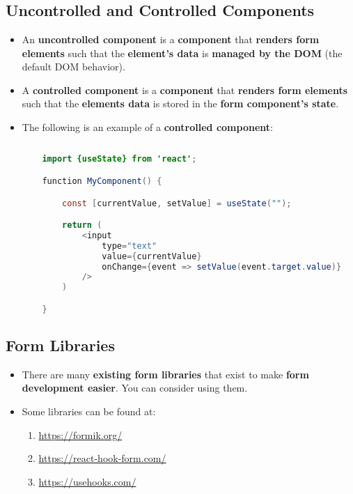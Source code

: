 \documentclass{article}
\begin{document}
    \section*{}

    \subsection*{Uncontrolled and Controlled Components}
    \begin{itemize}
        \item An \textbf{uncontrolled component} is a \textbf{component} that \textbf{renders form elements} such that the \textbf{element's data} is \textbf{managed by the DOM} (the default DOM behavior).
        \item A \textbf{controlled component} is a \textbf{component} that \textbf{renders form elements} such that the \textbf{elements data} is stored in the \textbf{form component's state}.
        \item The following is an example of a \textbf{controlled component}:
        \begin{lstlisting}[language=Java]
            
    import {useState} from 'react';

    function MyComponent() {

        const [currentValue, setValue] = useState("");

        return (
            <input 
                type="text"
                value={currentValue}
                onChange={event => setValue(event.target.value)}
            />
        )

    }
        \end{lstlisting}
    \end{itemize}

    \subsection*{Form Libraries}
    \begin{itemize}
        \item There are many \textbf{existing form libraries} that exist to make \textbf{form development easier}. You can consider using them.
        \item Some libraries can be found at: 
        \begin{enumerate}
            \item \url{https://formik.org/}
            \item \url{https://react-hook-form.com/}
            \item \url{https://usehooks.com/}
        \end{enumerate}
    \end{itemize}
\end{document}

